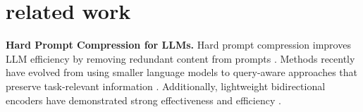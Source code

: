 \section{related work}
\noindent \textbf{Hard Prompt Compression for LLMs.}
Hard prompt compression improves LLM efficiency by removing redundant content from prompts \citep{DBLP:conf/naacl/LiLSC25}. 
Methods recently have evolved from using smaller language models \citep{DBLP:conf/emnlp/JiangWLYQ23, DBLP:conf/emnlp/0001DGL23, DBLP:conf/naacl/ChuangXCLCH24} to query-aware approaches that preserve task-relevant information \citep{weston2023system, DBLP:conf/iclr/CreswellSH23, DBLP:conf/acl/JiangWL0L0Q24}. 
Additionally, lightweight bidirectional encoders have demonstrated strong effectiveness and efficiency \citep{DBLP:conf/acl/PanWJXLZLR0LZQ024, DBLP:conf/aaai/LiskavetsURKEL25}.

